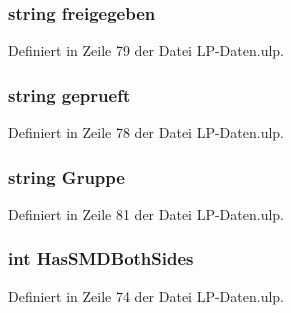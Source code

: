 \hypertarget{_l_p-_daten_8ulp_a06d333dc9622bc3a8b4e590022c75297}{}
\subsubsection[{freigegeben}]{\setlength{\rightskip}{0pt plus 5cm}string freigegeben}\label{_l_p-_daten_8ulp_a06d333dc9622bc3a8b4e590022c75297}


Definiert in Zeile 79 der Datei L\+P-\/\+Daten.\+ulp.

\hypertarget{_l_p-_daten_8ulp_a285b7e5593b6948aedaaba97394ca9ac}{}
\subsubsection[{geprueft}]{\setlength{\rightskip}{0pt plus 5cm}string geprueft}\label{_l_p-_daten_8ulp_a285b7e5593b6948aedaaba97394ca9ac}


Definiert in Zeile 78 der Datei L\+P-\/\+Daten.\+ulp.

\hypertarget{_l_p-_daten_8ulp_a47d4dad2288e4e9d400c39dc34630b01}{}
\subsubsection[{Gruppe}]{\setlength{\rightskip}{0pt plus 5cm}string Gruppe}\label{_l_p-_daten_8ulp_a47d4dad2288e4e9d400c39dc34630b01}


Definiert in Zeile 81 der Datei L\+P-\/\+Daten.\+ulp.

\hypertarget{_l_p-_daten_8ulp_aa0267591824a2748576aaf3d22e354e0}{}
\subsubsection[{Has\+S\+M\+D\+Both\+Sides}]{\setlength{\rightskip}{0pt plus 5cm}int Has\+S\+M\+D\+Both\+Sides}\label{_l_p-_daten_8ulp_aa0267591824a2748576aaf3d22e354e0}


Definiert in Zeile 74 der Datei L\+P-\/\+Daten.\+ulp.

